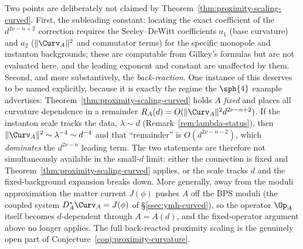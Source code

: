 \begin{remark}
\label{rem:curved-open}
Two points are deliberately not claimed by
Theorem~\ref{thm:proximity-scaling-curved}. First, the subleading
constant: locating the exact coefficient of the $d^{2\nu-n+2}$
correction requires the Seeley--DeWitt coefficients $a_1$ (base
curvature) and $a_2$ ($\|\Curv_A\|^2$ and commutator terms) for the
specific monopole and instanton backgrounds; these are computable from
Gilkey's formulas \cite{Gilkey1995} but are not evaluated here, and
the leading exponent and constant are unaffected by them. Second, and
more substantively, the \emph{back-reaction}. One instance of this
deserves to be named explicitly, because it is exactly the regime
the $\sph{4}$ example advertises:
Theorem~\ref{thm:proximity-scaling-curved} holds $A$ \emph{fixed}
and places all curvature dependence in a remainder
$R_A(d)=O(\|\Curv_A\|^2 d^{2\nu-n+2})$. If the instanton scale
tracks the data, $\lambda\sim d$
(Remark~\ref{rem:lambda-status}), then
$\|\Curv_A\|^2\sim\lambda^{-4}\sim d^{-4}$ and that ``remainder''
is $O(d^{2\nu-n-2})$, which \emph{dominates} the $d^{2\nu-n}$
leading term. The two statements are therefore not simultaneously
available in the small-$d$ limit: either the connection is fixed and
Theorem~\ref{thm:proximity-scaling-curved} applies, or the scale
tracks $d$ and the fixed-background expansion breaks down. More
generally, away from the moduli
approximation the matter current $J(\phi)$ pushes $A$ off the BPS
moduli (the coupled system $D_A^*\Curv_A=J(\phi)$ of
\S\ref{ssec:ymh-curved}), so the operator $\Op_A$ itself becomes
$d$-dependent through $A=A(d)$, and the fixed-operator argument above
no longer applies. The full back-reacted proximity scaling is the
genuinely open part of Conjecture~\ref{conj:proximity-curvature}.
\end{remark}

